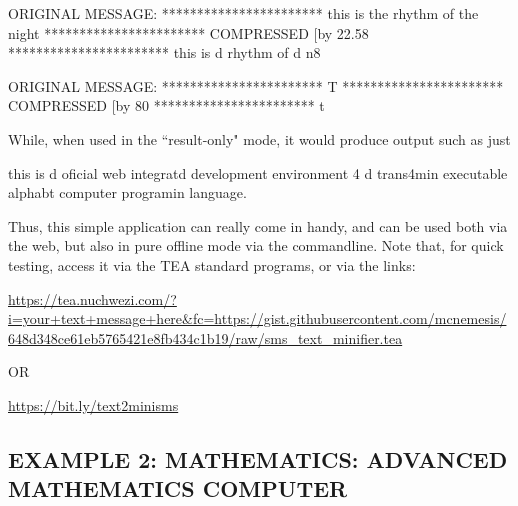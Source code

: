 \documentclass[a4paper, 18pt]{book} %
\begin{document}
{{{     \begin{tcbverbatim}[title=Sample OUTPUT 4 from TEXT MINIFIER v3]
ORIGINAL MESSAGE:
***********************
this is the rhythm of the night
***********************
COMPRESSED [by 22.58%
***********************
this is d rhythm of d n8
  \end{tcbverbatim}


\vspace{2em}

     \begin{tcbverbatim}[title=Sample OUTPUT 4 from TEXT MINIFIER v3]
ORIGINAL MESSAGE:
***********************
    T
***********************
COMPRESSED [by 80%
***********************
t
  \end{tcbverbatim}


\vspace{2em}


While, when used in the ``result-only" mode, it would produce output such as just

\vspace{2em}

     \begin{tcbverbatim}[title=Sample OUTPUT 4 from TEXT MINIFIER]
this is d oficial web integratd development environment 4 d trans4min executable alphabt computer programin language.
  \end{tcbverbatim}
  
  
 \vspace{2em}
 
 
 Thus, this simple application can really come in handy, and can be used both via the web, but also in pure offline mode via the commandline. Note that, for quick testing, access it via the TEA standard programs, or via the links:
 
 
 \vspace{1em}

 \url{https://tea.nuchwezi.com/?i=your+text+message+here&fc=https://gist.githubusercontent.com/mcnemesis/648d348ce61eb5765421e8fb434c1b19/raw/sms_text_minifier.tea}

\vspace{1em} 

OR

\vspace{1em} 

 \url{https://bit.ly/text2minisms}


\subsection{EXAMPLE 2: \textbf{MATHEMATICS:} ADVANCED MATHEMATICS COMPUTER}
\label{SECEXAMP2R}


}}}
\end{document}
